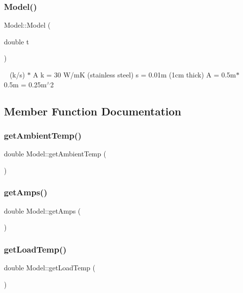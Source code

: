 \subsubsection{\texorpdfstring{Model()}{Model()}}
{\footnotesize\ttfamily Model\+::\+Model (\begin{DoxyParamCaption}\item[{double}]{t }\end{DoxyParamCaption})}

~\newline
(k/s) $\ast$ A k = 30 W/mK (stainless steel) s = 0.\+01m (1cm thick) A = 0.\+5m$\ast$0.5m = 0.\+25m$^\wedge$2

\subsection{Member Function Documentation}
\mbox{\label{class_model_a3fa2494f0e4d817ed2c96c6e8d4fa8ca}} 
\subsubsection{\texorpdfstring{get\+Ambient\+Temp()}{getAmbientTemp()}}
{\footnotesize\ttfamily double Model\+::get\+Ambient\+Temp (\begin{DoxyParamCaption}{ }\end{DoxyParamCaption})}

\mbox{\label{class_model_a56bbe0e7ef9e17d358a1bed355fcb192}} 
\subsubsection{\texorpdfstring{get\+Amps()}{getAmps()}}
{\footnotesize\ttfamily double Model\+::get\+Amps (\begin{DoxyParamCaption}{ }\end{DoxyParamCaption})}

\mbox{\label{class_model_aa308543029550abb6da1ee0f4fe8581f}} 
\subsubsection{\texorpdfstring{get\+Load\+Temp()}{getLoadTemp()}}
{\footnotesize\ttfamily double Model\+::get\+Load\+Temp (\begin{DoxyParamCaption}{ }\end{DoxyParamCaption})}

